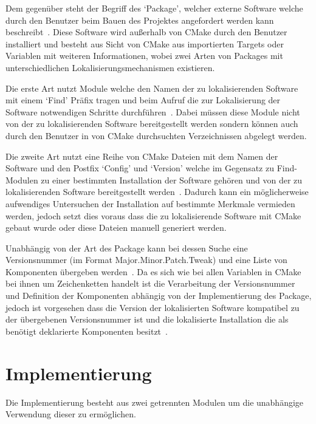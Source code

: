 \documentclass[german,proseminar,hyperref,utf8,lof]{zihpub}
\begin{document}
    Dem gegenüber steht der Begriff des `Package', welcher externe Software welche durch den
    Benutzer beim Bauen des Projektes angefordert werden kann
    beschreibt~.
    Diese Software wird au{\ss}erhalb von CMake durch den Benutzer installiert und besteht aus
    Sicht von CMake aus importierten Targets oder Variablen mit weiteren Informationen, wobei
    zwei Arten von Packages mit unterschiedlichen Lokalisierungsmechanismen existieren.

    Die erste Art nutzt Module welche den Namen der zu lokalisierenden Software mit einem `Find'
    Präfix tragen und beim Aufruf die zur Lokalisierung der Software notwendigen Schritte
    durchführen~.
    Dabei müssen diese Module nicht von der zu lokalisierenden Software bereitgestellt werden sondern
    können auch durch den Benutzer in von CMake durchsuchten Verzeichnissen abgelegt werden.

    Die zweite Art nutzt eine Reihe von CMake Dateien mit dem Namen der Software und den Postfix `Config'
    und `Version' welche im Gegensatz zu Find-Modulen zu einer bestimmten Installation der Software
    gehören und von der zu lokalisierenden Software bereitgestellt
    werden~.
    Dadurch kann ein möglicherweise aufwendiges Untersuchen der Installation auf bestimmte Merkmale
    vermieden werden, jedoch setzt dies voraus dass die zu lokalisierende Software mit CMake
    gebaut wurde oder diese Dateien manuell generiert werden.

    Unabhängig von der Art des Package kann bei dessen Suche eine Versionsnummer
    (im Format Major.Minor.Patch.Tweak) und eine Liste von Komponenten übergeben
    werden~.
    Da es sich wie bei allen Variablen in CMake bei ihnen um Zeichenketten handelt ist die Verarbeitung
    der Versionsnummer und Definition der Komponenten abhängig von der Implementierung des Package,
    jedoch ist vorgesehen dass die Version der lokalisierten Software kompatibel zu der übergebenen
    Versionsnummer ist und die lokalisierte Installation die als benötigt deklarierte Komponenten
    besitzt~.

    \newpage
    \section{Implementierung}
    Die Implementierung besteht aus zwei getrennten Modulen um die unabhängige Verwendung dieser
    zu ermöglichen.
\end{document}

